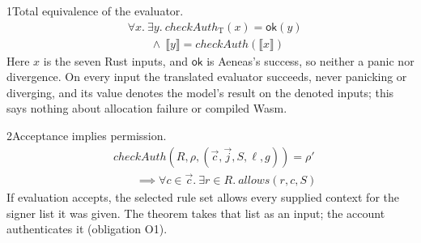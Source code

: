 \begin{perchstatement}{1}{Total equivalence of the evaluator.}\label{stmt:total-equivalence-of-the-evaluator}
\[\begin{aligned}&\forall x.\ \exists y.\ \mathit{checkAuth}_{\mathrm{T}}(x) = \mathsf{ok}(y)\\
&\qquad \land\ \llbracket y \rrbracket = \mathit{checkAuth}(\llbracket x \rrbracket)\end{aligned}\]
Here \(x\) is the seven Rust inputs, and \(\mathsf{ok}\) is Aeneas's success, so neither a panic nor divergence. On every input the translated evaluator succeeds, never panicking or diverging, and its value denotes the model's result on the denoted inputs; this says nothing about allocation failure or compiled Wasm.
\end{perchstatement}
\begin{perchstatement}{2}{Acceptance implies permission.}\label{stmt:acceptance-implies-permission}
\[\begin{aligned}&\mathit{checkAuth}(R, \rho, (\vec c, \vec j, S, \ell, g)) = \rho'\\
&\qquad \implies \forall c \in \vec c.\ \exists r \in R.\ \mathit{allows}(r, c, S)\end{aligned}\]
If evaluation accepts, the selected rule set allows every supplied context for the signer list it was given. The theorem takes that list as an input; the account authenticates it (obligation O1).
\end{perchstatement}
